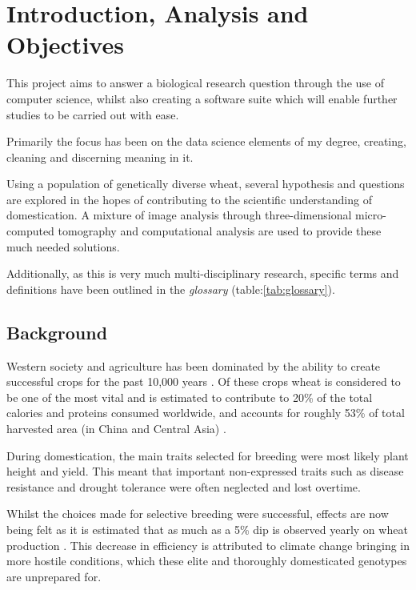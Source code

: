 \documentclass[11pt]{report}
\begin{document}
\chapter{Introduction, Analysis and Objectives}
\label{sec-1}

This project aims to answer a biological research question through the use of computer science, whilst also creating a software suite which will enable further studies to be carried out with ease.

Primarily the focus has been on the data science elements of my degree, creating, cleaning and discerning meaning in it.

Using a population of genetically diverse wheat, several hypothesis and questions are explored in the hopes of contributing to the scientific understanding of domestication. A mixture of image analysis through three-dimensional micro-computed tomography and computational analysis are used to provide these much needed solutions.

Additionally, as this is very much multi-disciplinary research, specific terms and definitions have been outlined in the \emph{glossary} (table:\ref{tab:glossary}).

\section{Background}
\label{sec-1-1}

Western society and agriculture has been dominated by the ability to create successful crops for the past 10,000 years \cite{Ozkan2002}. Of these crops wheat is considered to be one of the most vital and is estimated to contribute to 20\% of the total calories and proteins consumed worldwide, and accounts for roughly 53\% of total harvested area (in China and Central Asia) \cite{Shiferaw2013}.

During domestication, the main traits selected for breeding were most likely plant height and yield. This meant that important non-expressed traits such as disease resistance and drought tolerance were often neglected and lost overtime.

Whilst the choices made for selective breeding were successful, effects are now being felt as it is estimated that as much as a 5\% dip is observed yearly on wheat production \cite{Shiferaw2013}. This decrease in efficiency is attributed to climate change bringing in more hostile conditions, which these elite and thoroughly domesticated genotypes are unprepared for.
\end{document}

